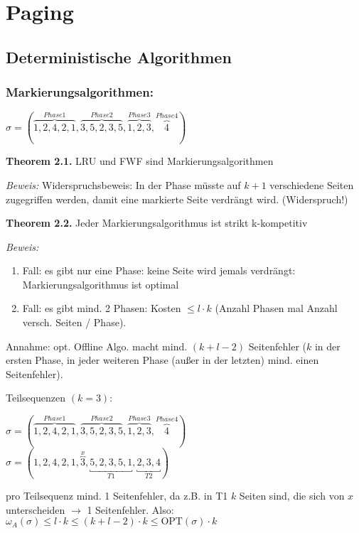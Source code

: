 \chapter{Paging}

\section{Deterministische Algorithmen}

\subsection{Markierungsalgorithmen:}
$\sigma = (\overbrace{1, 2, 4, 2, 1}^{Phase 1},\overbrace{3, 5, 2, 3, 5}^{Phase 2},\overbrace{1, 2, 3}^{Phase 3},\overbrace{4}^{Phase 4})$



\textbf{Theorem 2.1.} LRU und FWF sind Markierungsalgorithmen

\textit{Beweis:} Widerspruchsbeweis: In der Phase müsste auf $k + 1$ verschiedene Seiten zugegriffen werden, damit eine markierte Seite verdrängt wird. (Widerspruch!)



\textbf{Theorem 2.2.} Jeder Markierungsalgorithmus ist strikt k-kompetitiv

\textit{Beweis:}
\begin{enumerate}
\item Fall: es gibt nur eine Phase: keine Seite wird jemals verdrängt: Markierungsalgorithmus ist optimal
\item Fall: es gibt mind. 2 Phasen: Kosten $\le l \cdot k$ (Anzahl Phasen mal Anzahl versch. Seiten / Phase).
\end{enumerate}
Annahme: opt. Offline Algo. macht mind. $(k + l - 2)$ Seitenfehler ($k$ in der ersten Phase, in jeder weiteren Phase (außer in der letzten) mind. einen Seitenfehler).

Teilsequenzen $(k=3)$:

$\sigma = (\overbrace{1, 2, 4, 2, 1}^{Phase 1},\overbrace{3, 5, 2, 3, 5}^{Phase 2},\overbrace{1, 2, 3}^{Phase 3},\overbrace{4}^{Phase 4})$\\
$\sigma = (1, 2, 4, 2, 1, \overbracket{3}^{x}, \underbracket{5, 2, 3, 5, 1}_{T1}, \underbracket{2, 3, 4}_{T2})$

pro Teilsequenz mind. 1 Seitenfehler, da z.B. in T1 $k$ Seiten sind, die sich von $x$ unterscheiden $\to$ 1 Seitenfehler.
Also: $\omega_{A}(\sigma) \le l \cdot k \le (k + l - 2) \cdot k \le \textrm{OPT}(\sigma) \cdot k$



